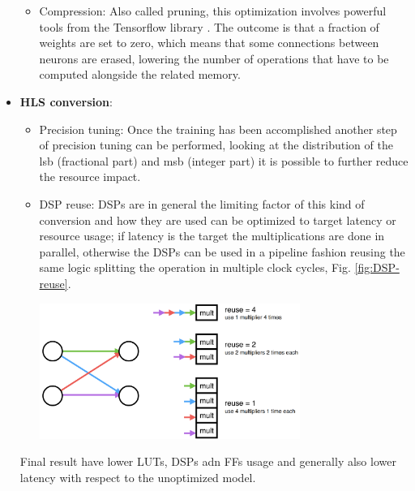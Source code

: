 \documentclass[../../main.tex]{subfiles}
\begin{document}
\begin{itemize}
\begin{itemize}
        \item Compression: Also called pruning, this optimization involves powerful tools from the Tensorflow library \cite{tfmot}. The outcome is that a fraction of weights are set to zero, which means that some connections between neurons are erased, lowering the number of operations that have to be computed alongside the related memory.  
        
    \end{itemize}
    
    \item \textbf{HLS conversion}: 
    \begin{itemize}
        \item Precision tuning: Once the training has been accomplished another step of precision tuning can be performed, looking at the distribution of the \acrshort{lsb} (fractional part) and \acrshort{msb} (integer part) it is possible to further reduce the resource impact.
        
        \item DSP reuse:  DSPs are in general the limiting factor of this kind of conversion and how they are used can be optimized to target latency or resource usage; if latency is the target the multiplications are done in parallel, otherwise the DSPs can be used in a pipeline fashion reusing the same logic splitting the operation in multiple clock cycles, Fig. \ref{fig:DSP-reuse}.
        
        \begin{minipage}{\linewidth}
            \centering
            \includegraphics[width=8.5cm]{sections/04/Images/reuse_factor.png}
            \label{fig:DSP-reuse}
        \end{minipage}
        
    \end{itemize}
    
     Final result have lower LUTs, DSPs adn FFs usage and generally also lower latency with respect to the unoptimized model.
    
\end{itemize}
    
\end{document}
